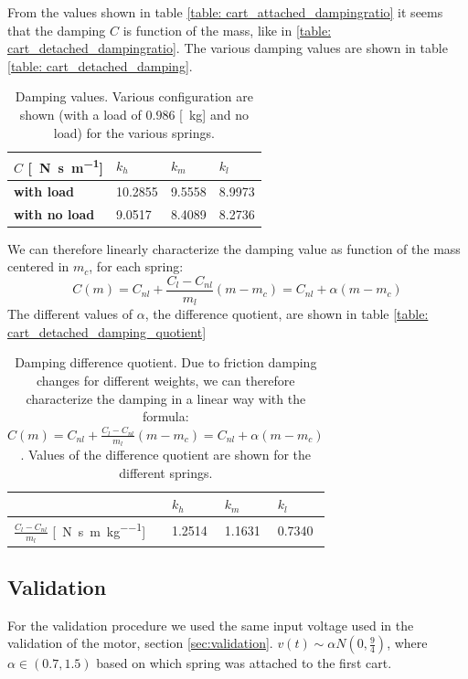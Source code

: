 From the values shown in table \ref{table: cart_attached_dampingratio} it seems that the damping $C$ is function of the mass, like in \ref{table: cart_detached_dampingratio}. The various damping values are shown in table 
\ref{table: cart_detached_damping}.
\begin{table}[!h]
\centering
\label{table: cart_attached_damping}
\begin{tabular}{|l|l|l|l|}
\hline
{$C$ [\SI{}{\newton \second \per \metre}]} & \textbf{$k_h$} & \textbf{$k_m$}   & \textbf{$k_l$}   \\ \hline
\textbf{with load}         &  10.2855    & 9.5558 & 8.9973 \\ \hline
\textbf{with no load}      & 9.0517 &    8.4089 &   8.2736      \\ \hline
\end{tabular}
\caption{Damping values. Various configuration are shown (with a load of $0.986$ [\SI{}{\kilo \gram}] and no load) for the various springs. }
\end{table}

We can therefore linearly characterize the damping value as function of the mass centered in $m_c$, for each spring:
$$C(m)=C_{nl}+ \frac{C_{l}-C_{nl}}{m_{l}}(m -m_{c}) = C_{nl} +\alpha (m-m_{c})$$
The different values of $\alpha$, the difference quotient, are shown in table \ref{table: cart_detached_damping_quotient}

\begin{table}[!h]
\centering
\label{table: cart_attached_damping_quotient}
\begin{tabular}{|l|l|l|l|}
\hline
 & \textbf{$k_h$} & \textbf{$k_m$}   & \textbf{$k_l$}   \\ \hline
$\frac{C_{l}-C_{nl}}{m_{l}}$ [\SI{}{\newton \second \per \metre \per \kilo\gram}]       &1.2514   & 1.1631 & 0.7340 \\ \hline
\end{tabular}
\caption{Damping difference quotient. Due to friction damping changes for different weights, we can therefore characterize the damping in a linear way with the formula: $C(m)=C_{nl}+ \frac{C_{l}-C_{nl}}{m_{l}}(m -m_{c})= C_{nl} +\alpha (m-m_{c})$. Values of the difference quotient are shown for the different springs.}
\end{table}

\subsection{Validation}
For the validation procedure we used the same input voltage used in the validation of the motor, section \ref{sec:validation}. $v(t) \sim \alpha N(0,\frac{9}{4})$, where $\alpha \in (0.7, 1.5)$ based on which spring was attached to the first cart. 
